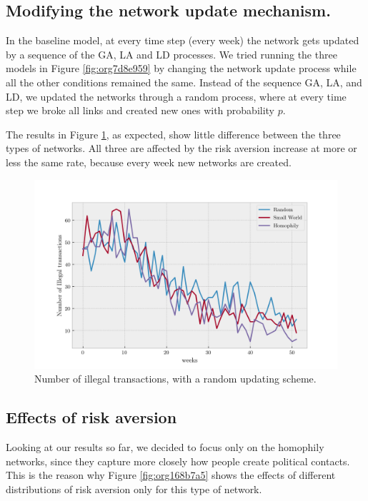 \documentclass[letterpaper, 11pt]{article}
\begin{document}
\subsection{Modifying the network update mechanism.}
\label{sec:org57dace3}
In the baseline model, at every time step (every week) the network gets updated by a sequence of the GA, LA and LD processes. We tried running the three models in Figure \ref{fig:org7d8e959} by changing the network update process while all the other conditions remained the same. Instead of the sequence GA, LA, and LD, we updated the networks through a random process, where at every time step we broke all links and created new ones with probability \(p\).

The results in Figure \ref{fig:orgb1afed9}, as expected, show little difference between the three types of networks. All three are affected by the risk aversion increase at more or less the same rate, because every week new networks are created. 

\begin{figure}[htbp]
\centering
\includegraphics[width=.9\linewidth]{img/f4.png}
\caption{\label{fig:orgb1afed9}
Number of illegal transactions, with a random updating scheme.}
\end{figure}

\subsection{Effects of risk aversion}
\label{sec:org08fe74e}
Looking at our results so far, we decided to focus only on the homophily networks, since they capture more closely how people create political contacts. This is the reason why
Figure \ref{fig:org168b7a5} shows the effects of different distributions of risk aversion only for this type of network.
\end{document}
